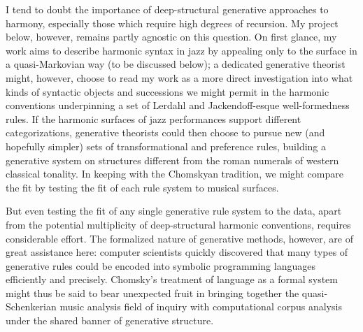 I tend to doubt the importance of deep-structural generative approaches to harmony, especially those which require high degrees of recursion.  My project below, however, remains partly agnostic on this question.  On first glance, my work aims to describe harmonic syntax in jazz by appealing only to the surface in a quasi-Markovian way (to be discussed below); a dedicated generative theorist might, however, choose to read my work as a more direct investigation into what kinds of syntactic objects and successions we might permit in the harmonic conventions underpinning a set of Lerdahl and Jackendoff-esque well-formedness rules.  If the harmonic surfaces of jazz performances support different categorizations, generative theorists could then choose to pursue new (and hopefully simpler) sets of transformational and preference rules, building a generative system on structures different from the roman numerals of western classical tonality.  In keeping with the Chomskyan tradition, we might compare the fit by testing the fit of each rule system to musical surfaces.

But even testing the fit of any single generative rule system to the data, apart from the potential multiplicity of deep-structural harmonic conventions, requires considerable effort.  The formalized nature of generative methods, however, are of great assistance here: computer scientists quickly discovered that many types of generative rules could be encoded into symbolic programming languages efficiently and precisely.  Chomsky's treatment of language as a formal system might thus be said to bear unexpected fruit in bringing together the quasi-Schenkerian music analysis field of inquiry with computational corpus analysis under the shared banner of generative structure.

